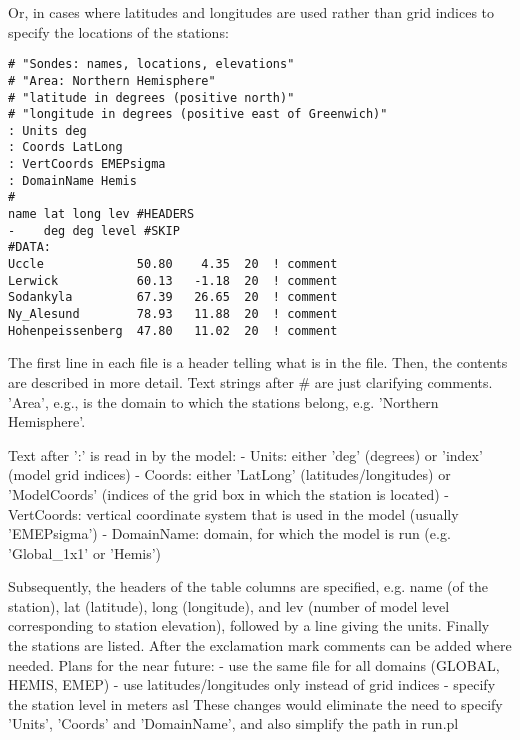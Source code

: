 Or, in cases where latitudes and longitudes are used rather than grid
indices to specify the locations of the stations:

\begin{small}
\begin{verbatim}
# "Sondes: names, locations, elevations"
# "Area: Northern Hemisphere"
# "latitude in degrees (positive north)"
# "longitude in degrees (positive east of Greenwich)"
: Units deg
: Coords LatLong
: VertCoords EMEPsigma
: DomainName Hemis
#
name lat long lev #HEADERS
-    deg deg level #SKIP
#DATA:
Uccle             50.80    4.35  20  ! comment
Lerwick           60.13   -1.18  20  ! comment
Sodankyla         67.39   26.65  20  ! comment
Ny_Alesund        78.93   11.88  20  ! comment
Hohenpeissenberg  47.80   11.02  20  ! comment
\end{verbatim}
\end{small}

The first line in each file is a header telling what is in the file.
Then, the contents are described in more detail. Text strings after
\# are just clarifying comments. 'Area', e.g., is the domain to which
the stations belong, e.g. 'Northern Hemisphere'.

Text after ':' is read in by the model:\newline
- Units: either 'deg' (degrees) or 'index' (model grid indices)\newline
- Coords: either 'LatLong' (latitudes/longitudes) or 'ModelCoords'
(indices of the grid box in which the station is located)\newline
- VertCoords: vertical coordinate system that is used in the model (usually
'EMEPsigma')\newline
- DomainName: domain, for which the model is run (e.g. 'Global\_1x1' or 'Hemis')\newline

Subsequently, the headers of the table columns are specified, e.g.
name (of the station), lat (latitude), long (longitude), and lev
(number of model level corresponding to station elevation),
followed by a line giving the units.
Finally the stations are listed. After the exclamation mark comments
can be added where needed.
\newline
\newline
Plans for the near future:\newline
- use the same file for all domains (GLOBAL, HEMIS, EMEP)\newline
- use latitudes/longitudes only instead of grid indices\newline
- specify the station level in meters asl\newline
\newline
These changes would eliminate the need to specify 'Units',
'Coords' and 'DomainName', and also simplify the path in run.pl
\newline

